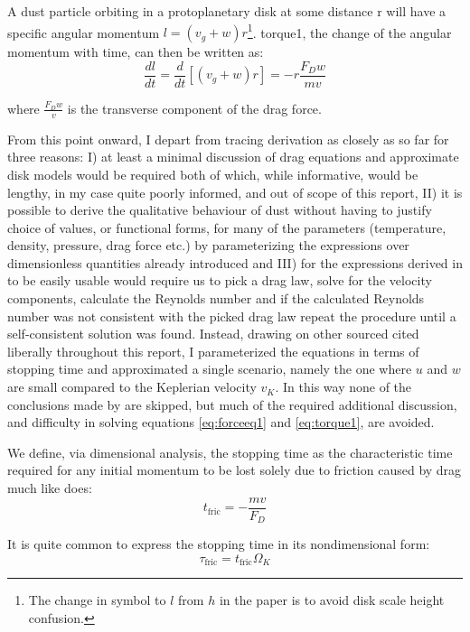 \documentclass[12pt]{article}
\begin{document}
A dust particle orbiting in a protoplanetary disk at some distance r will have a specific angular momentum $l=(v_g + w)r$\footnote{The change in symbol to $l$ from $h$ in the paper is to avoid disk scale height confusion.}. torque1, the change of the angular momentum with time, can then be written as: 
\begin{equation}
    \label{eq:torque1} 
    \frac{dl}{dt} = \frac{d}{dt} \left[ (v_g+w)r \right] = -r\frac{F_D w}{mv}
\end{equation}

\noindent where $\frac{F_D w}{v}$ is the transverse component of the drag force.

From this point onward, I depart from tracing \citet{Weidenschilling77} derivation as closely as so far for three reasons: I) at least a minimal discussion of drag equations and approximate disk models would be required both of which, while informative, would be lengthy, in my case quite poorly informed, and out of scope of this report, II) it is possible to derive the qualitative behaviour of dust without having to justify choice of values, or functional forms, for many of the parameters (temperature, density, pressure, drag force etc.) by parameterizing the expressions over dimensionless quantities already introduced and III) for the expressions derived in \citet{Weidenschilling77} to be easily usable would require us to pick a drag law, solve for the velocity components, calculate the Reynolds number and if the calculated Reynolds number was not consistent with the picked drag law repeat the procedure until a self-consistent solution was found. Instead, drawing on other sourced cited liberally throughout this report, I parameterized the equations in terms of stopping time and approximated a single scenario, namely the one where $u$ and $w$ are small compared to the Keplerian velocity $v_K$. In this way none of the conclusions made by \citet{Weidenschilling77} are skipped, but much of the required additional discussion, and difficulty in solving equations \ref{eq:forceeq1} and \ref{eq:torque1}, are avoided.

 We define, via dimensional analysis, the stopping time as the characteristic time required for any initial momentum to be lost solely due to friction caused by drag much like\citet{Weidenschilling77} does:
\begin{equation}
    t_{\mathrm{fric}} = -\frac{mv}{F_D} 
\end{equation}

It is quite common to express the stopping time in its nondimensional form: 
\begin{equation}
    \label{eq:nondimfric}
    \tau_{\mathrm{fric}} = t_{\mathrm{fric}}\Omega_K
\end{equation}
\end{document}
